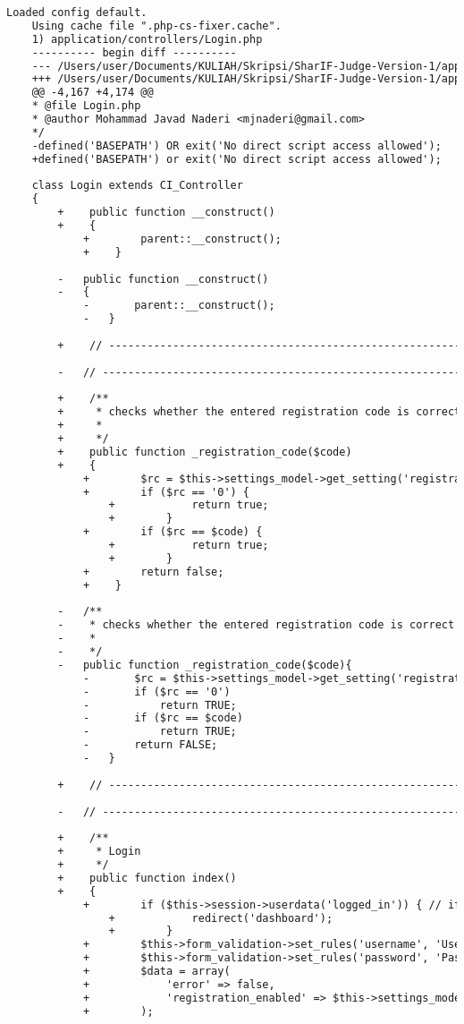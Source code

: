 \begin{lstlisting}[language=diff, caption=Perubahan pada kode Login.php]
	Loaded config default.
	Using cache file ".php-cs-fixer.cache".
	1) application/controllers/Login.php
	---------- begin diff ----------
	--- /Users/user/Documents/KULIAH/Skripsi/SharIF-Judge-Version-1/application/controllers/Login.php
	+++ /Users/user/Documents/KULIAH/Skripsi/SharIF-Judge-Version-1/application/controllers/Login.php
	@@ -4,167 +4,174 @@
	* @file Login.php
	* @author Mohammad Javad Naderi <mjnaderi@gmail.com>
	*/
	-defined('BASEPATH') OR exit('No direct script access allowed');
	+defined('BASEPATH') or exit('No direct script access allowed');
	
	class Login extends CI_Controller
	{
		+    public function __construct()
		+    {
			+        parent::__construct();
			+    }
		
		-	public function __construct()
		-	{
			-		parent::__construct();
			-	}
		
		+    // ------------------------------------------------------------------------
		
		-	// ------------------------------------------------------------------------
		
		+    /**
		+     * checks whether the entered registration code is correct or not
		+     *
		+     */
		+    public function _registration_code($code)
		+    {
			+        $rc = $this->settings_model->get_setting('registration_code');
			+        if ($rc == '0') {
				+            return true;
				+        }
			+        if ($rc == $code) {
				+            return true;
				+        }
			+        return false;
			+    }
		
		-	/**
		-	 * checks whether the entered registration code is correct or not
		-	 *
		-	 */
		-	public function _registration_code($code){
			-		$rc = $this->settings_model->get_setting('registration_code');
			-		if ($rc == '0')
			-			return TRUE;
			-		if ($rc == $code)
			-			return TRUE;
			-		return FALSE;
			-	}
		
		+    // ------------------------------------------------------------------------
		
		-	// ------------------------------------------------------------------------
		
		+    /**
		+     * Login
		+     */
		+    public function index()
		+    {
			+        if ($this->session->userdata('logged_in')) { // if logged in
				+            redirect('dashboard');
				+        }
			+        $this->form_validation->set_rules('username', 'Username', 'required|min_length[3]|max_length[20]|alpha_numeric|lowercase');
			+        $this->form_validation->set_rules('password', 'Password', 'required|min_length[6]|max_length[200]');
			+        $data = array(
			+            'error' => false,
			+            'registration_enabled' => $this->settings_model->get_setting('enable_registration'),
			+        );
			

\end{lstlisting}
